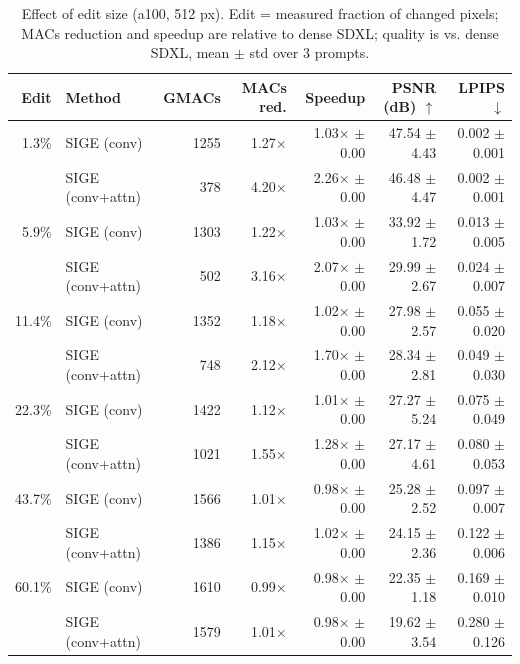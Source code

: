 \begin{table}[t]
\centering
\small
\caption{Effect of edit size (a100, 512 px). Edit = measured fraction of changed pixels; MACs reduction and speedup are relative to dense SDXL; quality is vs. dense SDXL, mean $\pm$ std over 3 prompts.}
\label{tab:edit_size_a100}
\begin{tabular}{rlrrrrr}
\toprule
Edit & Method & GMACs & MACs red. & Speedup & PSNR (dB) $\uparrow$ & LPIPS $\downarrow$ \\
\midrule
1.3\% & SIGE (conv) & 1255 & 1.27$\times$ & 1.03$\times$ $\pm$ 0.00 & 47.54 $\pm$ 4.43 & 0.002 $\pm$ 0.001 \\
 & SIGE (conv+attn) & 378 & 4.20$\times$ & 2.26$\times$ $\pm$ 0.00 & 46.48 $\pm$ 4.47 & 0.002 $\pm$ 0.001 \\
\midrule
5.9\% & SIGE (conv) & 1303 & 1.22$\times$ & 1.03$\times$ $\pm$ 0.00 & 33.92 $\pm$ 1.72 & 0.013 $\pm$ 0.005 \\
 & SIGE (conv+attn) & 502 & 3.16$\times$ & 2.07$\times$ $\pm$ 0.00 & 29.99 $\pm$ 2.67 & 0.024 $\pm$ 0.007 \\
\midrule
11.4\% & SIGE (conv) & 1352 & 1.18$\times$ & 1.02$\times$ $\pm$ 0.00 & 27.98 $\pm$ 2.57 & 0.055 $\pm$ 0.020 \\
 & SIGE (conv+attn) & 748 & 2.12$\times$ & 1.70$\times$ $\pm$ 0.00 & 28.34 $\pm$ 2.81 & 0.049 $\pm$ 0.030 \\
\midrule
22.3\% & SIGE (conv) & 1422 & 1.12$\times$ & 1.01$\times$ $\pm$ 0.00 & 27.27 $\pm$ 5.24 & 0.075 $\pm$ 0.049 \\
 & SIGE (conv+attn) & 1021 & 1.55$\times$ & 1.28$\times$ $\pm$ 0.00 & 27.17 $\pm$ 4.61 & 0.080 $\pm$ 0.053 \\
\midrule
43.7\% & SIGE (conv) & 1566 & 1.01$\times$ & 0.98$\times$ $\pm$ 0.00 & 25.28 $\pm$ 2.52 & 0.097 $\pm$ 0.007 \\
 & SIGE (conv+attn) & 1386 & 1.15$\times$ & 1.02$\times$ $\pm$ 0.00 & 24.15 $\pm$ 2.36 & 0.122 $\pm$ 0.006 \\
\midrule
60.1\% & SIGE (conv) & 1610 & 0.99$\times$ & 0.98$\times$ $\pm$ 0.00 & 22.35 $\pm$ 1.18 & 0.169 $\pm$ 0.010 \\
 & SIGE (conv+attn) & 1579 & 1.01$\times$ & 0.98$\times$ $\pm$ 0.00 & 19.62 $\pm$ 3.54 & 0.280 $\pm$ 0.126 \\
\bottomrule
\end{tabular}
\end{table}

